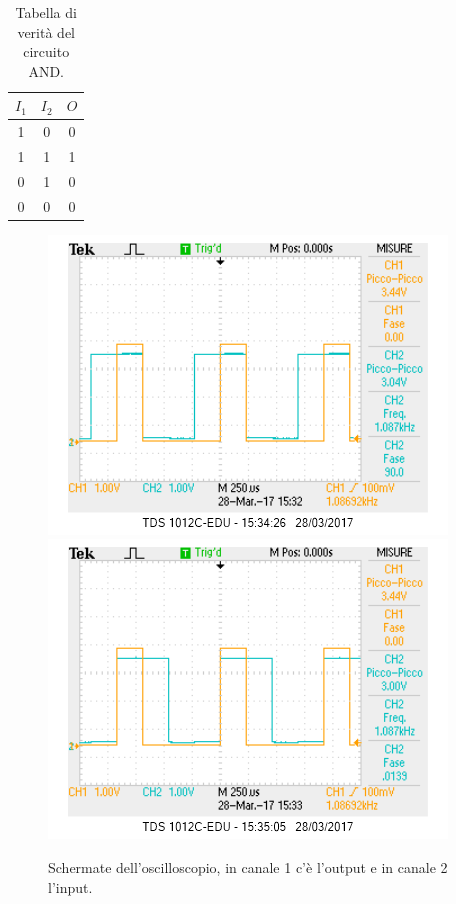 \documentclass[10pt,a4paper]{article}
\begin{document}
\begin{table}[!htb]
\centering
\begin{tabular}{|c|c|c|}
\hline 
$I_1$ & $I_2$ & $O$ \\
\hline
 1 &  0 & 0\\ 

 1 &  1 & 1\\ 

 0 &  1 & 0\\ 

 0 &  0 & 0\\ 
\hline 
\end{tabular} 
\caption{Tabella di verità del circuito AND.\label{tab:AND}}
\end{table}

\begin{figure}[!htb]
  \centering
  \includegraphics[scale=0.75]{and1.png}\includegraphics[scale=0.75]{and2.png}
\caption{Schermate dell'oscilloscopio, in canale 1 c'è l'output e in canale 2 l'input.\label{osc:AND}}
\end{figure}
\end{document}
